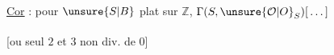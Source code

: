 
\uline{Cor} : pour $\unsure{S|B}$ plat sur $\mathbb{Z}$, $\Gamma(S,\unsure{\mathcal{O}|O}_S)[\,\ldots\,]$

[ou seul\textsuperscript{\uline{}} $2$ et $3$ non div. de $0$]

